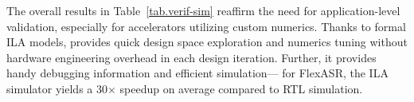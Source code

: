The overall results in Table~\ref{tab.verif-sim} reaffirm the need for application-level validation, especially for accelerators utilizing custom numerics.
%
%
%
Thanks to formal ILA models, \TLA provides quick design space exploration and numerics tuning without hardware engineering overhead %
in each design iteration.
%
%
Further, it provides handy debugging information and efficient simulation---%
%
for FlexASR, the ILA simulator yields a 30$\times$ speedup on average compared to RTL simulation.


